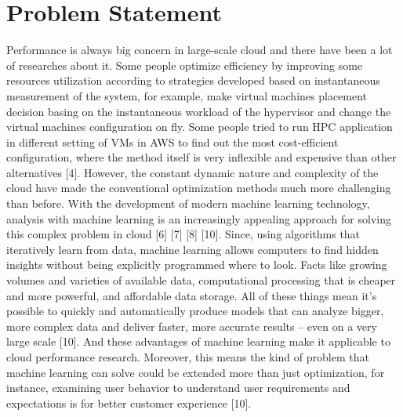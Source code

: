 \section{Problem Statement}
\label{sec:ProblemStatement}

Performance is always big concern in large-scale cloud and there have been a lot of researches about it. Some people optimize efficiency by improving some resources utilization according to strategies developed based on instantaneous measurement of the system, for example, make virtual machines placement decision basing on the instantaneous workload of the hypervisor and change the virtual machines configuration on fly. Some people tried to run HPC application in different setting of VMs in AWS to find out the most cost-efficient configuration, where the method itself is very inflexible and expensive than other alternatives [4]. However, the constant dynamic nature and complexity of the cloud have made the conventional optimization methods much more challenging than before. With the development of modern machine learning technology, analysis with machine learning is an increasingly appealing approach for solving this complex problem in cloud [6] [7] [8] [10]. Since, using algorithms that iteratively learn from data, machine learning allows computers to find hidden insights without being explicitly programmed where to look. Facts like growing volumes and varieties of available data, computational processing that is cheaper and more powerful, and affordable data storage. All of these things mean it's possible to quickly and automatically produce models that can analyze bigger, more complex data and deliver faster, more accurate results – even on a very large scale [10]. And these advantages of machine learning make it applicable to cloud performance research. Moreover, this means the kind of problem that machine learning can solve could be extended more than just optimization, for instance, examining user behavior to understand user requirements and expectations is for better customer experience [10].
